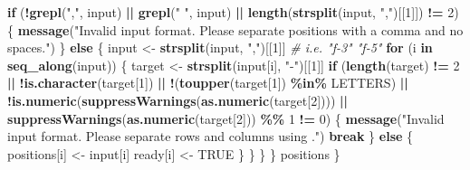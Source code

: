 \documentclass[
]{article}
\newenvironment{Shaded}{\begin{snugshade}}{\end{snugshade}}
\newcommand{\CommentTok}[1]{\textcolor[rgb]{0.56,0.35,0.01}{\textit{#1}}}
\newcommand{\ConstantTok}[1]{\textcolor[rgb]{0.56,0.35,0.01}{#1}}
\newcommand{\ControlFlowTok}[1]{\textcolor[rgb]{0.13,0.29,0.53}{\textbf{#1}}}
\newcommand{\DecValTok}[1]{\textcolor[rgb]{0.00,0.00,0.81}{#1}}
\newcommand{\FunctionTok}[1]{\textcolor[rgb]{0.13,0.29,0.53}{\textbf{#1}}}
\newcommand{\NormalTok}[1]{#1}
\newcommand{\OtherTok}[1]{\textcolor[rgb]{0.56,0.35,0.01}{#1}}
\newcommand{\SpecialCharTok}[1]{\textcolor[rgb]{0.81,0.36,0.00}{\textbf{#1}}}
\newcommand{\StringTok}[1]{\textcolor[rgb]{0.31,0.60,0.02}{#1}}
\begin{document}
\begin{Shaded}
\begin{Highlighting}[]
      \ControlFlowTok{if}\NormalTok{ (}\SpecialCharTok{!}\FunctionTok{grepl}\NormalTok{(}\StringTok{","}\NormalTok{, input) }\SpecialCharTok{||}
          \FunctionTok{grepl}\NormalTok{(}\StringTok{" "}\NormalTok{, input) }\SpecialCharTok{||} \FunctionTok{length}\NormalTok{(}\FunctionTok{strsplit}\NormalTok{(input, }\StringTok{","}\NormalTok{)[[}\DecValTok{1}\NormalTok{]]) }\SpecialCharTok{!=} \DecValTok{2}\NormalTok{) \{}
        \FunctionTok{message}\NormalTok{(}\StringTok{"Invalid input format. Please separate positions with a comma and no spaces."}\NormalTok{)}
\NormalTok{      \} }\ControlFlowTok{else}\NormalTok{ \{}
\NormalTok{        input }\OtherTok{\textless{}{-}} \FunctionTok{strsplit}\NormalTok{(input, }\StringTok{","}\NormalTok{)[[}\DecValTok{1}\NormalTok{]] }\CommentTok{\# i.e. "f{-}3" "f{-}5"}
        \ControlFlowTok{for}\NormalTok{ (i }\ControlFlowTok{in} \FunctionTok{seq\_along}\NormalTok{(input)) \{}
\NormalTok{          target }\OtherTok{\textless{}{-}} \FunctionTok{strsplit}\NormalTok{(input[i], }\StringTok{"{-}"}\NormalTok{)[[}\DecValTok{1}\NormalTok{]]}
          \ControlFlowTok{if}\NormalTok{ (}\FunctionTok{length}\NormalTok{(target) }\SpecialCharTok{!=} \DecValTok{2} \SpecialCharTok{||}
              \SpecialCharTok{!}\FunctionTok{is.character}\NormalTok{(target[}\DecValTok{1}\NormalTok{]) }\SpecialCharTok{||}
              \SpecialCharTok{!}\NormalTok{(}\FunctionTok{toupper}\NormalTok{(target[}\DecValTok{1}\NormalTok{]) }\SpecialCharTok{\%in\%}\NormalTok{ LETTERS) }\SpecialCharTok{||}
              \SpecialCharTok{!}\FunctionTok{is.numeric}\NormalTok{(}\FunctionTok{suppressWarnings}\NormalTok{(}\FunctionTok{as.numeric}\NormalTok{(target[}\DecValTok{2}\NormalTok{]))) }\SpecialCharTok{||}
              \FunctionTok{suppressWarnings}\NormalTok{(}\FunctionTok{as.numeric}\NormalTok{(target[}\DecValTok{2}\NormalTok{])) }\SpecialCharTok{\%\%} \DecValTok{1} \SpecialCharTok{!=} \DecValTok{0}\NormalTok{) \{}
            \FunctionTok{message}\NormalTok{(}\StringTok{"Invalid input format. Please separate rows and columns using \textquotesingle{}{-}\textquotesingle{}."}\NormalTok{)}
            \ControlFlowTok{break}
\NormalTok{          \} }\ControlFlowTok{else}\NormalTok{ \{}
\NormalTok{            positions[i] }\OtherTok{\textless{}{-}}\NormalTok{ input[i]}
\NormalTok{            ready[i] }\OtherTok{\textless{}{-}} \ConstantTok{TRUE}
\NormalTok{          \}}
\NormalTok{        \}}
\NormalTok{      \}}
\NormalTok{    \}}
\NormalTok{    positions}
\NormalTok{  \}}
  

\end{Highlighting}
\end{Shaded}
\end{document}
